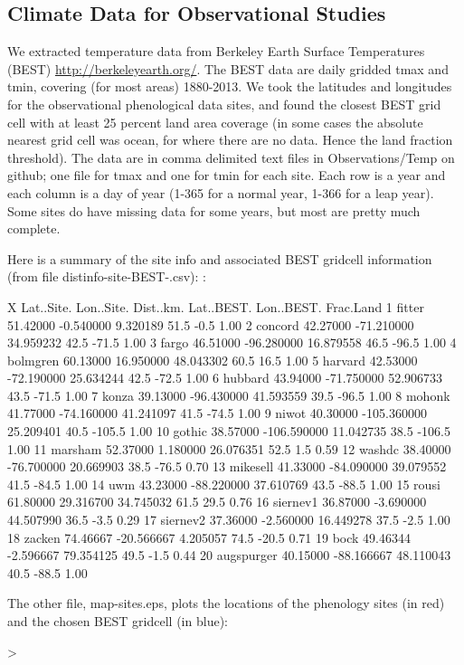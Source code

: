 \documentclass{article}
\begin{document}
\subsection{Climate Data for Observational Studies}

We extracted temperature data from Berkeley Earth Surface Temperatures (BEST) \url{http://berkeleyearth.org/}. The BEST data are daily gridded tmax and tmin, covering (for most areas) 1880-2013. We took the latitudes and longitudes for the observational phenological data sites, and found the closest BEST grid cell with at least 25 percent land area coverage (in some cases the absolute nearest grid cell was ocean, for where there are no data. Hence the land fraction threshold). The data are in comma delimited text files in Observations/Temp on github; one file for tmax and one for tmin for each site. Each row is a year and each column is a day of year (1-365 for a normal year, 1-366 for a leap year). Some sites do have missing data for some years, but most are pretty much complete.


Here is a summary of the site info and associated BEST gridcell information (from file 
distinfo-site-BEST-.csv):
:

\begin{Schunk}
\begin{Soutput}
            X Lat..Site.  Lon..Site. Dist..km. Lat..BEST. Lon..BEST. Frac.Land
1      fitter   51.42000   -0.540000  9.320189       51.5       -0.5      1.00
2     concord   42.27000  -71.210000 34.959232       42.5      -71.5      1.00
3       fargo   46.51000  -96.280000 16.879558       46.5      -96.5      1.00
4    bolmgren   60.13000   16.950000 48.043302       60.5       16.5      1.00
5     harvard   42.53000  -72.190000 25.634244       42.5      -72.5      1.00
6     hubbard   43.94000  -71.750000 52.906733       43.5      -71.5      1.00
7       konza   39.13000  -96.430000 41.593559       39.5      -96.5      1.00
8      mohonk   41.77000  -74.160000 41.241097       41.5      -74.5      1.00
9       niwot   40.30000 -105.360000 25.209401       40.5     -105.5      1.00
10     gothic   38.57000 -106.590000 11.042735       38.5     -106.5      1.00
11    marsham   52.37000    1.180000 26.076351       52.5        1.5      0.59
12     washdc   38.40000  -76.700000 20.669903       38.5      -76.5      0.70
13   mikesell   41.33000  -84.090000 39.079552       41.5      -84.5      1.00
14        uwm   43.23000  -88.220000 37.610769       43.5      -88.5      1.00
15      rousi   61.80000   29.316700 34.745032       61.5       29.5      0.76
16   siernev1   36.87000   -3.690000 44.507990       36.5       -3.5      0.29
17   siernev2   37.36000   -2.560000 16.449278       37.5       -2.5      1.00
18     zacken   74.46667  -20.566667  4.205057       74.5      -20.5      0.71
19       bock   49.46344   -2.596667 79.354125       49.5       -1.5      0.44
20 augspurger   40.15000  -88.166667 48.110043       40.5      -88.5      1.00
\end{Soutput}
\end{Schunk}


The other file, map-sites.eps, plots the locations of the phenology sites (in red) and the chosen BEST gridcell (in blue):

\begin{Schunk}
\begin{Sinput}
> 
\end{Sinput}
\end{Schunk}
\end{document}
